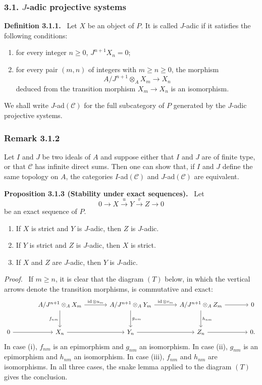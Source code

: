 \documentclass[11pt]{article}
\newenvironment{statement}[1]{\par\medskip\noindent\textbf{#1.}\ }{\par\medskip}
\newenvironment{prooftext}[1][Proof]{\par\noindent\emph{#1.}\ }{\par\medskip}
\providecommand{\id}{\operatorname{id}}
\providecommand{\cC}{\mathcal C}
\providecommand{\id}{\operatorname{id}}
\providecommand{\id}{\operatorname{id}}
\providecommand{\id}{\operatorname{id}}
\providecommand{\id}{\operatorname{id}}
\providecommand{\cC}{\mathcal C}
\providecommand{\id}{\operatorname{id}}
\begin{document}
\subsubsection*{3.1. $J$-adic projective systems}
\begin{statement}{Definition 3.1.1}
Let $X$ be an object of $P$. It is called $J$-adic if it satisfies the following conditions:
\begin{enumerate}[label=(\roman*)]
\item for every integer $n\ge0$, $J^{n+1}X_n=0$;
\item for every pair $(m,n)$ of integers with $m\ge n\ge0$, the morphism
\[
A/J^{n+1}\otimes_A X_m\longrightarrow X_n
\]
deduced from the transition morphism $X_m\to X_n$ is an isomorphism.
\end{enumerate}
\end{statement}
We shall write $J$-ad$(\cC)$ for the full subcategory of $P$ generated by the $J$-adic projective systems.

\subsubsection*{Remark 3.1.2}
Let $I$ and $J$ be two ideals of $A$ and suppose either that $I$ and $J$ are of finite type, or that $\cC$ has infinite direct sums. Then one can show that, if $I$ and $J$ define the same topology on $A$, the categories $I$-ad$(\cC)$ and $J$-ad$(\cC)$ are equivalent.

\begin{statement}{Proposition 3.1.3 (Stability under exact sequences)}
Let
\[
0\longrightarrow X\stackrel{u}{\longrightarrow}Y\stackrel{v}{\longrightarrow}Z\longrightarrow0
\]
be an exact sequence of $P$.
\begin{enumerate}[label=(\roman*)]
\item If $X$ is strict and $Y$ is $J$-adic, then $Z$ is $J$-adic.
\item If $Y$ is strict and $Z$ is $J$-adic, then $X$ is strict.
\item If $X$ and $Z$ are $J$-adic, then $Y$ is $J$-adic.
\end{enumerate}
\end{statement}

\begin{prooftext}[Proof]
If $m\ge n$, it is clear that the diagram $(T)$ below, in which the vertical arrows denote the transition morphisms, is commutative and exact:
\[
\begin{tikzcd}[column sep=large,row sep=large]
{} & A/J^{n+1}\otimes_A X_m \arrow[r,"\id\otimes u_m"] \arrow[d,"f_{nm}"'] & A/J^{n+1}\otimes_A Y_m \arrow[r,"\id\otimes v_m"] \arrow[d,"g_{nm}"] & A/J^{n+1}\otimes_A Z_m \arrow[r] \arrow[d,"h_{nm}"] & 0\\
0 \arrow[r] & X_n \arrow[r] & Y_n \arrow[r] & Z_n \arrow[r] & 0 .
\end{tikzcd}
\]
In case (i), $f_{nm}$ is an epimorphism and $g_{nm}$ an isomorphism. In case (ii), $g_{nm}$ is an epimorphism and $h_{nm}$ an isomorphism. In case (iii), $f_{nm}$ and $h_{nm}$ are isomorphisms. In all three cases, the snake lemma applied to the diagram $(T)$ gives the conclusion.
\end{prooftext}
\end{document}
